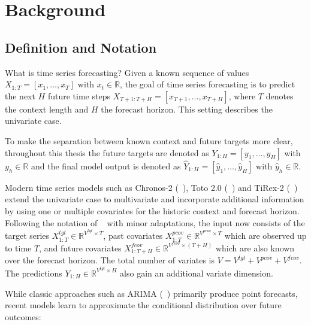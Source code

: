 \cleardoubleoddpage%
\chapter{Background}
\label{sec:background}


\section{Definition and Notation}
\label{sec:definition}

What is time series forecasting? Given a known sequence of values $X_{1:T} = [x_1, \hdots, x_T]$ with $x_t \in \mathbb{R}$, the goal of time series forecasting is to predict the next $H$ future time steps $X_{T+1:T+H} = [x_{T+1}, \hdots, x_{T+H}]$, where $T$ denotes the context length and $H$ the forecast horizon. This setting describes the univariate case.

To make the separation between known context and future targets more clear, throughout this thesis the future targets are denoted as $Y_{1:H} = [y_{1}, \hdots, y_{H}]$ with $y_h \in \mathbb{R}$ and the final model output is denoted as $\hat{Y}_{1:H} = [\hat{y}_{1}, \hdots, \hat{y}_{H}]$ with $\hat{y}_h \in \mathbb{R}$.

Modern time series models such as Chronos-2 (\citeauthor{chronos2}~\cite{chronos2}), Toto 2.0 (\citeauthor{toto2}~\cite{toto2}) and TiRex-2 (\citeauthor{tirex2}~\cite{tirex2}) extend the univariate case to multivariate and incorporate additional information by using one or multiple covariates for the historic context and forecast horizon. Following the notation of \citeauthor{tirex2}~\cite{tirex2} with minor adaptations, the input now consists of the target series $X^{tgt}_{1:T} \in \mathbb{R}^{V^{tgt} \times T}$, past covariates $X^{pcov}_{1:T} \in \mathbb{R}^{V^{pcov} \times T}$ which are observed up to time $T$, and future covariates $X^{fcov}_{1:T+H} \in \mathbb{R}^{V^{fcov} \times (T+H)}$ which are also known over the forecast horizon. The total number of variates is $V = V^{tgt} + V^{pcov} + V^{fcov}$. The predictions $Y_{1:H} \in \mathbb{R}^{V^{tgt} \times H}$ also gain an additional variate dimension.

While classic approaches such as ARIMA (\citeauthor{arima}~\cite{arima}) primarily produce point forecasts, recent models learn to approximate the conditional distribution over future outcomes:

